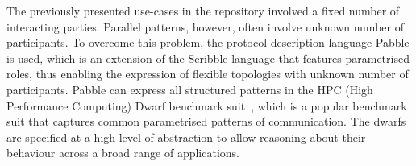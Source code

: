 


The previously presented use-cases in the repository
involved a fixed number of interacting parties.
Parallel patterns, however, often involve unknown
number of participants.
To overcome this problem, the protocol description
language Pabble is used, which is an extension
of the Scribble language that features parametrised
roles, thus enabling the expression of flexible topologies
with unknown number of participants.
Pabble can express all structured patterns in the
HPC (High Performance Computing) Dwarf benchmark suit~\cite{BerkleyPar}, 
which is a popular benchmark suit that captures
common parametrised patterns of communication.
The dwarfs are specified at a high level of abstraction to
allow reasoning about their behaviour across a broad
range of applications.

